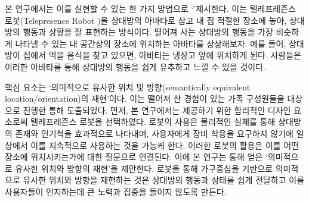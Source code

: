 
본 연구에서는 이를 실현할 수 있는 한 가지 방법으로 `\approach'\을 제시한다. 이는 텔레프레즌스 로봇(Telepresence Robot \cite{double_robotics})을 상대방의 아바타로 삼고 내 집 적절한 장소에 놓아, 상대방의 행동과 상황을 잘 표현하는 방식이다. 떨어져 사는 상대방의 행동을 가장 비슷하게 나타낼 수 있는 내 공간상의 장소에 위치하는 아바타를 상상해보자. 예를 들어, 상대방이 집에서 먹을 음식을 찾고 있으면, 아바타는 냉장고 앞에 위치하게 된다. 사람들은 이러한 아바타를 통해 상대방의 행동을 쉽게 유추하고 \concept\을 느낄 수 있을 것이다.




 핵심 요소는 `의미적으로 유사한 위치 및 방향(semantically equivalent location/orientation)의 재현'이다.
이는 떨어져 산 경험이 있는 가족 구성원들을 대상으로 진행한 \expWorkshop\을 통해 도출되었다.
먼저, 본 연구에서는  제공하기 위한 합리적인 디자인 요소로써 텔레프레즌스 로봇을 선택하였다.
로봇의 사용은 물리적인 실체를 통해 상대방의 존재와 인기척을 효과적으로 나타내며, 사용자에게 장비 착용을 요구하지 않기에 일상에서 이를 지속적으로 사용하는 것을 가능케 한다.
이러한 로봇의 활용은 이를 어떤 장소에 위치시키는가에 대한 질문으로 연결된다. 이에 본 연구는  통해 얻은 `의미적으로 유사한 위치와 방향의 재현'을 제안한다.
로봇을 통해 가구중심을 기반으로 의미적으로 유사한 위치와 방향을 재현하는 것은 상대방의 행동과 상태를 쉽게 전달하고 이를 사용자들이 인지하는데 큰 노력과 집중을 들이지 않도록 만든다. 


